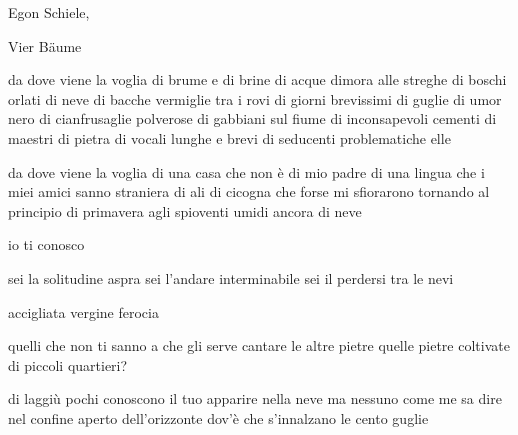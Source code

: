 \begin{volumetitlepage}
\end{volumetitlepage}


\begin{artItem}
	Egon Schiele, \begin{otherlanguage}{german}%
		Vier Bäume%
	\end{otherlanguage}
\end{artItem}

\begin{poem}
	\begin{stanza}
		da dove viene la voglia\verseline
		di brume e di brine\verseline
		di acque dimora alle streghe\verseline
		di boschi orlati di neve\verseline
		di bacche vermiglie tra i rovi\verseline
		di giorni brevissimi\verseline
		di guglie di umor nero\verseline
		di cianfrusaglie polverose\verseline
		di gabbiani sul fiume\verseline
		di inconsapevoli cementi\verseline
		di maestri di pietra\verseline
		di vocali lunghe e brevi\verseline
		di seducenti problematiche elle
	\end{stanza}

	\begin{stanza}
		da dove viene la voglia\verseline
		di una casa che non è di mio padre\verseline
		di una lingua che i miei amici sanno straniera\verseline
		di ali di cicogna che forse mi sfiorarono\verseline
		tornando al principio di primavera\verseline
		agli spioventi umidi ancora di neve
	\end{stanza}
\end{poem}

\clearpage


\begin{poem}
	\begin{stanza}
		io ti conosco
	\end{stanza}

	\begin{stanza}
		sei la solitudine aspra\verseline
		sei l’andare interminabile\verseline
		sei il perdersi tra le nevi
	\end{stanza}

	\begin{stanza}
		accigliata vergine ferocia
	\end{stanza}

	\begin{stanza}
		quelli che non ti sanno\verseline
		a che gli serve cantare le altre pietre\verseline
		quelle pietre coltivate di piccoli quartieri?
	\end{stanza}

	\begin{stanza}
		di laggiù pochi conoscono\verseline
		il tuo apparire nella neve\verseline
		ma nessuno come me sa dire\verseline
		nel confine aperto dell’orizzonte\verseline
		dov’è che s’innalzano\verseline
		le cento guglie
	\end{stanza}
\end{poem}

